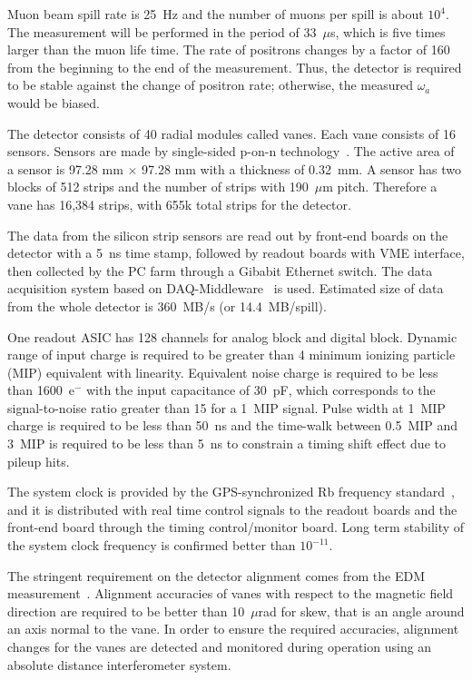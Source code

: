 Muon beam spill rate is 25~Hz and the number of muons per spill is about $10^4$.
The measurement will be performed in the period of 33~$\mu$s, which is
 five times larger than the muon life time. The rate of positrons
changes by a factor of 160 from the beginning to the end of the measurement.
Thus, the detector is required to be stable against the change of positron rate;
otherwise, the measured $\omega_a$ would be biased.

The detector consists of 40 radial modules called vanes.
Each vane consists of 16 sensors.
Sensors are made by single-sided p-on-n technology~\cite{sensor}.
The active area of a sensor is 97.28 mm $\times$ 97.28 mm with
a thickness of 0.32~mm.
A sensor has two blocks of 512 strips and the number of strips
with 190~$\mu$m pitch. Therefore a vane has 16,384 strips, with 655k total strips for the detector.

The data from the silicon strip sensors are read out by front-end
boards on the detector with a 5~ns time stamp, followed by readout boards with 
VME interface,
then collected by the PC farm through a Gibabit Ethernet switch.
The data acquisition system based on DAQ-Middleware~\cite{DAQ-Middleware} is used.
Estimated size of data from the whole detector is 360~MB/s (or 14.4~MB/spill).

One readout ASIC has 128 channels for analog block and digital block.
Dynamic range of input charge is required to be greater than
4 minimum ionizing particle (MIP) equivalent with linearity.
Equivalent noise charge is required to be less than 
1600~e$^{-}$ with the input capacitance of 30~pF, which
corresponds to the signal-to-noise ratio greater than 15
for a 1~MIP signal. Pulse width at 1~MIP charge is required to
be less than 50~ns and the time-walk between 0.5~MIP and 3~MIP
is required to be less than 5~ns to constrain a timing shift effect
due to pileup hits.

The system clock is provided by the GPS-synchronized Rb frequency
standard~\cite{freqtime}, and it is distributed with real time control signals
to the readout boards and the front-end board through the timing
control/monitor board. Long term stability of the system clock
frequency is confirmed better than $10^{-11}$.

The stringent requirement on the detector alignment comes
from the EDM measurement~\cite{EDM_requirement}. Alignment accuracies of vanes
with respect to the magnetic field direction
are required to be better than 10~$\mu$rad for skew, that is an
angle around an axis normal to the vane. 
In order to ensure the required accuracies, alignment changes for the
vanes are detected and monitored during operation using an absolute
distance interferometer system.

